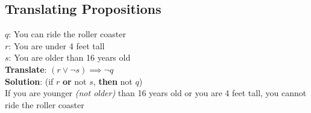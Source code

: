 \documentclass{article}
\begin{document}
\subsection{Translating Propositions}
$ q $: You can ride the roller coaster \\
$ r $: You are under 4 feet tall \\
$ s $: You are older than 16 years old \\
\textbf{Translate}: $ (r \lor \neg s) \implies \neg q $ \\


\textbf{Solution}: (if $ r $ \textbf{or} not $ s $, \textbf{then} not $ q $) \\
If you are younger \textit{(not older)} than 16 years old or you are 4 feet tall, you cannot ride the roller coaster 
\end{document}
